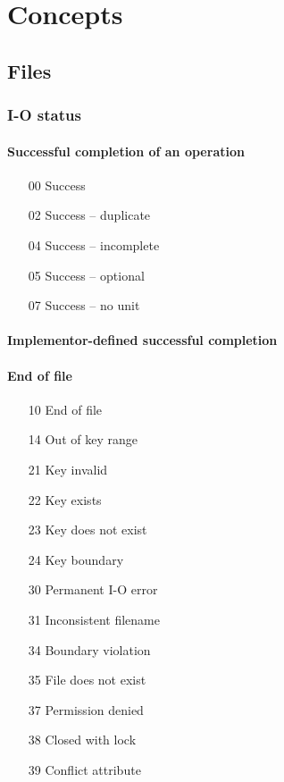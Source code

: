 \section{Concepts}

\subsection{Files}

\subsubsection{I-O status}

\paragraph{Successful completion of an operation}
\begin{enumerate}
\item[00] Success
\item[02] Success -- duplicate
\item[04] Success -- incomplete
\item[05] Success -- optional
\item[07] Success -- no unit
\end{enumerate}

\paragraph{Implementor-defined successful completion}
\paragraph{End of file}
\begin{enumerate}
\item[10] End of file
\item[14] Out of key range
\end{enumerate}

\begin{enumerate}
\item[21] Key invalid
\item[22] Key exists
\item[23] Key does not exist
\item[24] Key boundary
\end{enumerate}


\begin{enumerate}
\item[30] Permanent I-O error
\item[31] Inconsistent filename
\item[34] Boundary violation
\item[35] File does not exist
\item[37] Permission denied
\item[38] Closed with lock
\item[39] Conflict attribute
\end{enumerate}

